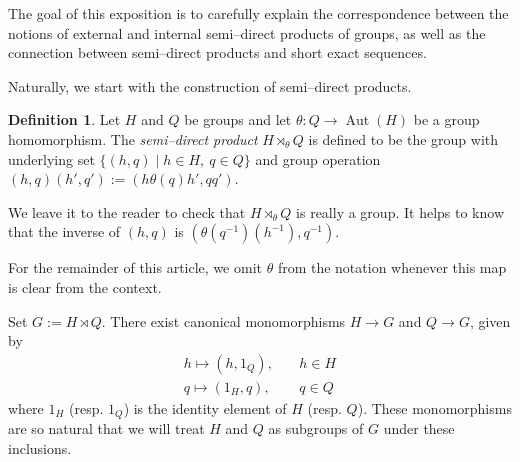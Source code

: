 \documentclass[12pt]{article}
\newcommand{\0}{\bf{0}}
\newcommand{\<}{\langle}
\renewcommand{\>}{\rangle}
\newcommand{\lra}{\longrightarrow}
\newcommand{\st}{\mid}
\newcommand{\Aut}{\operatorname{Aut}}
\newcommand{\semidirect}{\rtimes}
\theoremstyle{definition}
\newtheorem{definition}[theorem]{Definition}
\begin{document}
The goal of this exposition is to carefully explain the correspondence
between the notions of external and internal semi--direct products of
groups, as well as the connection between semi--direct products and
short exact sequences.

Naturally, we start with the construction of semi--direct products.

\begin{definition}
Let $H$ and $Q$ be groups and let $\theta: Q \lra \Aut(H)$ be a group
homomorphism. The {\em semi--direct product} $H \semidirect_\theta Q$
is defined to be the group with underlying set $\{(h,q) \st h \in
H,\ q \in Q\}$ and group operation $(h,q)(h',q') := (h \theta(q) h',
qq')$.
\end{definition}

We leave it to the reader to check that $H \semidirect_\theta Q$ is
really a group. It helps to know that the inverse of $(h,q)$ is
$(\theta(q^{-1}) (h^{-1}), q^{-1})$.

For the remainder of this article, we omit $\theta$ from the notation
whenever this map is clear from the context.

Set $G := H \semidirect Q$. There exist canonical monomorphisms $H
\lra G$ and $Q \lra G$, given by
\begin{eqnarray*}
h \mapsto (h,1_Q),& \ & h \in H \\
q \mapsto (1_H,q),& \ & q \in Q
\end{eqnarray*}
where $1_H$ (resp. $1_Q$) is the identity element of $H$
(resp. $Q$). These monomorphisms are so natural that we will treat $H$
and $Q$ as subgroups of $G$ under these inclusions.
\end{document}
